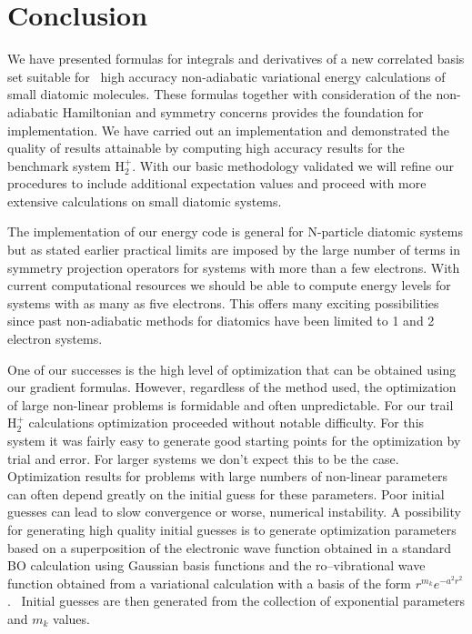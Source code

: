 \documentclass[12pt]{article}
\begin{document}
\section{Conclusion}

We have presented formulas for integrals and derivatives of a new correlated
basis set suitable for \ high accuracy non-adiabatic variational energy
calculations of small diatomic molecules. These formulas together with
consideration of the non-adiabatic Hamiltonian and symmetry concerns provides
the foundation for implementation. We have carried out an implementation and
demonstrated the quality of results attainable by computing high accuracy
results for the benchmark system H$_{2}^{+}$.  With our basic methodology
validated we will refine our procedures to include additional expectation
values and proceed with more extensive calculations on small diatomic systems.

The implementation of our energy code is general for N-particle diatomic
systems but as stated earlier practical limits are imposed by the large number
of terms in symmetry projection operators for systems with more than a few
electrons. With current computational resources we should be able to compute
energy levels for systems with as many as five electrons. This offers many
exciting possibilities since past non-adiabatic methods for diatomics have
been limited to 1 and 2 electron systems.

One of our successes is the high level of optimization that can be obtained
using our gradient formulas. However, regardless of the method used, the
optimization of large non-linear problems is formidable and often
unpredictable. For our trail H$_{2}^{+}$ calculations optimization proceeded
without notable difficulty. For this system it was fairly easy to generate
good starting points for the optimization by trial and error. For larger
systems we don't expect this to be the case. Optimization results for problems
with large numbers of non-linear parameters can often depend greatly on the
initial guess for these parameters. Poor initial guesses can lead to slow
convergence or worse, numerical instability. A possibility for generating high
quality initial guesses is to generate optimization parameters based on a
superposition of the electronic wave function obtained in a standard BO
calculation using Gaussian basis functions and the ro--vibrational wave
function obtained from a variational calculation with a basis of the
form\cite{Kinghorn97b} $r^{m_{k}}e^{-a^{2}r^{2}}$. \ Initial guesses are then
generated from the collection of exponential parameters and $m_{k}$ values.
\end{document}
